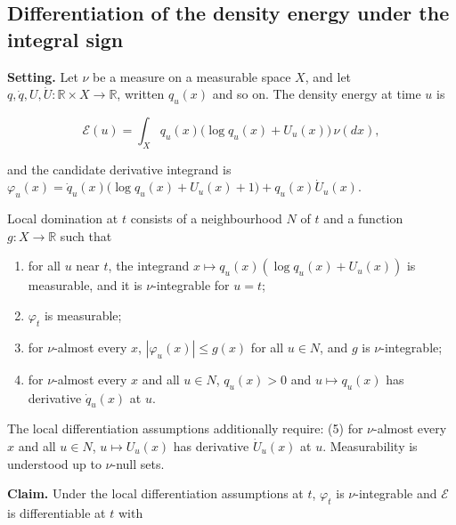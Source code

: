 \documentclass[11pt,a4paper]{report}
\begin{document}
\subsection{\texorpdfstring{Differentiation of the density energy under the integral sign}{Differentiation of the density energy under the integral sign}}


\textbf{Setting.} Let \(\nu\) be a measure on a measurable space \(X\), and let \(q,\dot q,U,\dot U:\mathbb R\times X\to\mathbb R\), written \(q_u(x)\) and so on. The density energy at time \(u\) is


\[\mathcal E(u)=\int_Xq_u(x)\bigl(\log q_u(x)+U_u(x)\bigr)\,\nu(dx),\]


and the candidate derivative integrand is \(\varphi_u(x)=\dot q_u(x)\bigl(\log q_u(x)+U_u(x)+1\bigr)+q_u(x)\dot U_u(x)\).






Local domination at \(t\) consists of a neighbourhood \(N\) of \(t\) and a function \(g:X\to\mathbb R\) such that



\begin{enumerate}


\item for all \(u\) near \(t\), the integrand \(x\mapsto q_u(x)(\log q_u(x)+U_u(x))\) is measurable, and it is \(\nu\)-integrable for \(u=t\);

\item \(\varphi_t\) is measurable;

\item for \(\nu\)-almost every \(x\), \(|\varphi_u(x)|\le g(x)\) for all \(u\in N\), and \(g\) is \(\nu\)-integrable;

\item for \(\nu\)-almost every \(x\) and all \(u\in N\), \(q_u(x)>0\) and \(u\mapsto q_u(x)\) has derivative \(\dot q_u(x)\) at \(u\).

\end{enumerate}





The local differentiation assumptions additionally require: (5) for \(\nu\)-almost every \(x\) and all \(u\in N\), \(u\mapsto U_u(x)\) has derivative \(\dot U_u(x)\) at \(u\). Measurability is understood up to \(\nu\)-null sets.




\textbf{Claim.} Under the local differentiation assumptions at \(t\), \(\varphi_t\) is \(\nu\)-integrable and \(\mathcal E\) is differentiable at \(t\) with
\end{document}
